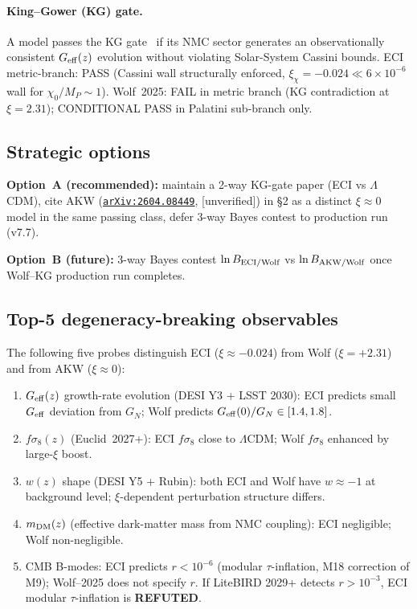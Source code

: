 \documentclass[a4paper,11pt]{article}
\newcommand{\arXiv}[1]{\href{https://arxiv.org/abs/#1}{\texttt{arXiv:#1}}}
\theoremstyle{definition}
\theoremstyle{remark}
\begin{document}
\paragraph{King--Gower (KG) gate.}
A model passes the KG gate~\cite{Wolf25} if its NMC sector
generates an observationally consistent $G_{\rm eff}(z)$
evolution without violating Solar-System Cassini bounds.
ECI metric-branch: PASS (Cassini wall structurally enforced,
$\xi_\chi=-0.024 \ll 6\times10^{-6}$ wall for
$\chi_0/M_P\sim1$).  Wolf~2025: FAIL in metric branch (KG
contradiction at $\xi=2.31$); CONDITIONAL PASS in Palatini
sub-branch only.

\subsection{Strategic options}

\textbf{Option~A (recommended):} maintain a 2-way KG-gate paper
(ECI vs $\Lambda$CDM), cite AKW (\arXiv{2604.08449}, [unverified]) in \S2 as a
distinct $\xi\approx0$ model in the same passing class, defer
3-way Bayes contest to production run (v7.7).

\textbf{Option~B (future):} 3-way Bayes contest
$\ln B_{{\rm ECI}/{\rm Wolf}}$ vs $\ln B_{{\rm AKW}/{\rm Wolf}}$
once Wolf--KG production run completes.

\subsection{Top-5 degeneracy-breaking observables}

The following five probes distinguish ECI ($\xi\approx-0.024$)
from Wolf ($\xi=+2.31$) and from AKW ($\xi\approx0$):
\begin{enumerate}
  \item $G_{\rm eff}(z)$ growth-rate evolution (DESI Y3 + LSST
    2030): ECI predicts small $G_{\rm eff}$ deviation from $G_N$;
    Wolf predicts $G_{\rm eff}(0)/G_N\in[1.4,1.8]$.
  \item $f\sigma_8(z)$ (Euclid~2027+): ECI $f\sigma_8$ close to
    $\Lambda$CDM; Wolf $f\sigma_8$ enhanced by large-$\xi$ boost.
  \item $w(z)$ shape (DESI Y5 + Rubin): both ECI and Wolf have
    $w\approx-1$ at background level; $\xi$-dependent perturbation
    structure differs.
  \item $m_{\rm DM}(z)$ (effective dark-matter mass from NMC
    coupling): ECI negligible; Wolf non-negligible.
  \item CMB B-modes: ECI predicts $r<10^{-6}$ (modular $\tau$-inflation,
    M18 correction of M9); Wolf--2025 does not specify $r$.  If
    LiteBIRD 2029+ detects $r>10^{-3}$, ECI modular
    $\tau$-inflation is \textbf{REFUTED}.
\end{enumerate}
\end{document}
